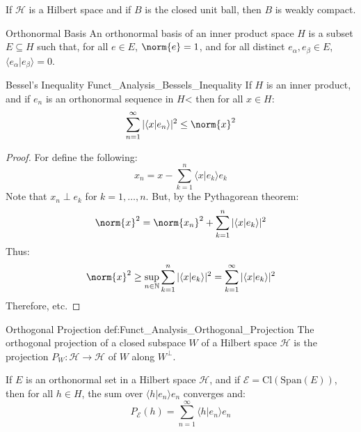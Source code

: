     \begin{theorem}
        If $\mathcal{H}$ is a Hilbert space and if
        $B$ is the closed unit ball, then $B$ is
        weakly compact.
    \end{theorem}
    \begin{ldefinition}{Orthonormal Basis}
        An orthonormal basis of an inner product
        space $H$ is a subset $E\subseteq{H}$ such that, for
        all $e\in{E}$, $\norm{e}=1$, and for all distinct
        $e_{\alpha},e_{\beta}\in{E}$,
        $\langle{e_{\alpha}|e_{\beta}}\rangle=0$.
    \end{ldefinition}
    \begin{ltheorem}{Bessel's Inequality}
          {Funct_Analysis_Bessels_Inequality}
        If $H$ is an inner product, and if
        $e_{n}$ is an orthonormal sequence in $H$< then
        for all $x\in{H}$:
        \begin{equation}
            \sum_{n=1}^{\infty}|\langle{x|e_{n}}\rangle|^{2}
                \leq\norm{x}^{2}
        \end{equation}
    \end{ltheorem}
    \begin{proof}
        For define the following:
        \begin{equation}
            x_{n}=x-\sum_{k=1}^{n}
                \langle{x|e_{k}}\rangle{e}_{k}
        \end{equation}
        Note that $x_{n}\perp{e}_{k}$ for $k=1,\dots,n$.
        But, by the Pythagorean theorem:
        \begin{equation}
            \norm{x}^{2}=\norm{x_{n}}^{2}+
                \sum_{k=1}^{n}|\langle{x|e_{k}}\rangle|^{2}
        \end{equation}
        Thus:
        \begin{equation}
            \norm{x}^{2}\geq\underset{n\in\mathbb{N}}{\sup}
                \sum_{k=1}^{n}|\langle{x|e_{k}}\rangle|^{2}
                =\sum_{k=1}^{\infty}|\langle{x|e_{k}}\rangle|^{2}
        \end{equation}
        Therefore, etc.
    \end{proof}
    \begin{ldefinition}{Orthogonal Projection}
          {def:Funct_Analysis_Orthogonal_Projection}
        The orthogonal projection of a closed subspace $W$
        of a Hilbert space $\mathcal{H}$ is the projection
        $P_{W}:\mathcal{H}\rightarrow\mathcal{H}$ of
        $W$ along $W^{\perp}$.
    \end{ldefinition}
    \begin{theorem}
        If $E$ is an orthonormal set in a Hilbert space
        $\mathcal{H}$, and if
        $\mathcal{E}=\mathrm{Cl}(\mathrm{Span}(E))$, then for all
        $h\in{H}$, the sum over
        $\langle{h|e_{n}}\rangle{e}_{n}$ converges and:
        \begin{equation}
            P_{\mathcal{E}}(h)=\sum_{n=1}^{\infty}
                \langle{h|e_{n}}\rangle{e}_{n}
        \end{equation}
    \end{theorem}

